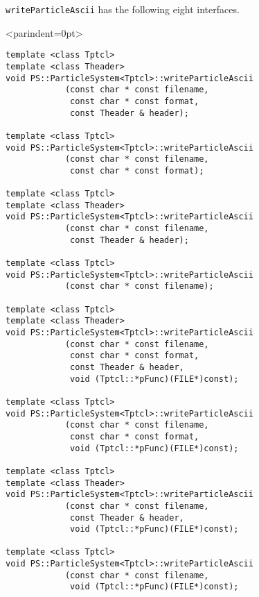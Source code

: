 \texttt{writeParticleAscii} has the following eight interfaces.
\begin{breakitembox}<parindent=0pt>{}
\begin{verbatim}
template <class Tptcl>
template <class Theader>
void PS::ParticleSystem<Tptcl>::writeParticleAscii
            (const char * const filename,
             const char * const format,
             const Theader & header);
             
template <class Tptcl>
void PS::ParticleSystem<Tptcl>::writeParticleAscii
            (const char * const filename,
             const char * const format);

template <class Tptcl>
template <class Theader>
void PS::ParticleSystem<Tptcl>::writeParticleAscii
            (const char * const filename,
             const Theader & header);

template <class Tptcl>
void PS::ParticleSystem<Tptcl>::writeParticleAscii
            (const char * const filename);

template <class Tptcl>
template <class Theader>
void PS::ParticleSystem<Tptcl>::writeParticleAscii
            (const char * const filename,
             const char * const format,
             const Theader & header,
             void (Tptcl::*pFunc)(FILE*)const);

template <class Tptcl>
void PS::ParticleSystem<Tptcl>::writeParticleAscii
            (const char * const filename,
             const char * const format,
             void (Tptcl::*pFunc)(FILE*)const);

template <class Tptcl>             
template <class Theader>
void PS::ParticleSystem<Tptcl>::writeParticleAscii
            (const char * const filename,
             const Theader & header,
             void (Tptcl::*pFunc)(FILE*)const);
             
template <class Tptcl>                        
void PS::ParticleSystem<Tptcl>::writeParticleAscii
            (const char * const filename,
             void (Tptcl::*pFunc)(FILE*)const);
\end{verbatim}
\end{breakitembox}

